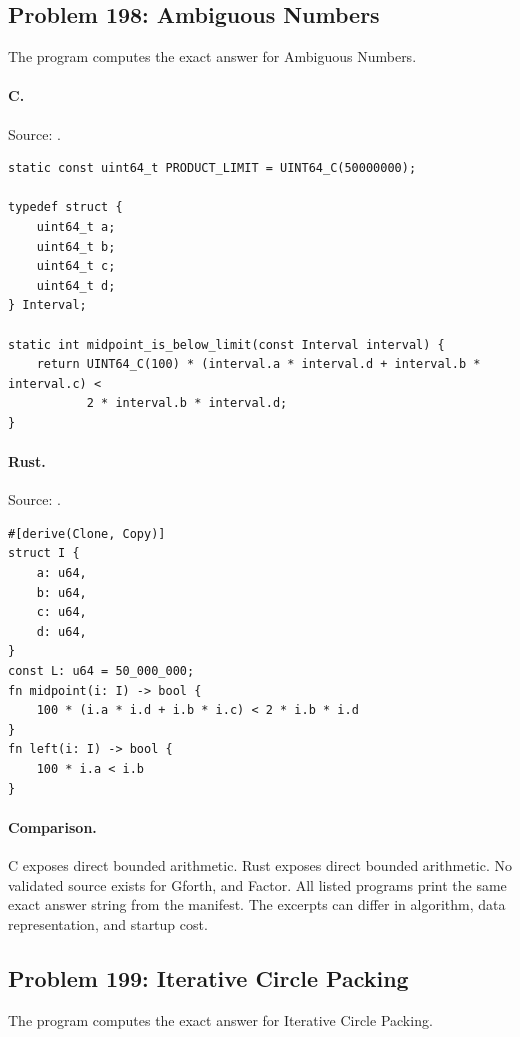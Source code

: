 \subsection{Problem 198: Ambiguous Numbers}
\label{walkthrough:p198}
The program computes the exact answer for Ambiguous Numbers.

\paragraph{C.} Source: .
\begin{lstlisting}
static const uint64_t PRODUCT_LIMIT = UINT64_C(50000000);

typedef struct {
    uint64_t a;
    uint64_t b;
    uint64_t c;
    uint64_t d;
} Interval;

static int midpoint_is_below_limit(const Interval interval) {
    return UINT64_C(100) * (interval.a * interval.d + interval.b * interval.c) <
           2 * interval.b * interval.d;
}
\end{lstlisting}

\paragraph{Rust.} Source: .
\begin{lstlisting}
#[derive(Clone, Copy)]
struct I {
    a: u64,
    b: u64,
    c: u64,
    d: u64,
}
const L: u64 = 50_000_000;
fn midpoint(i: I) -> bool {
    100 * (i.a * i.d + i.b * i.c) < 2 * i.b * i.d
}
fn left(i: I) -> bool {
    100 * i.a < i.b
}
\end{lstlisting}

\paragraph{Comparison.}
C exposes direct bounded arithmetic. Rust exposes direct bounded arithmetic.
No validated source exists for Gforth, and Factor.
All listed programs print the same exact answer string from the manifest. The excerpts can differ in algorithm, data representation, and startup cost.

\subsection{Problem 199: Iterative Circle Packing}
\label{walkthrough:p199}
The program computes the exact answer for Iterative Circle Packing.

